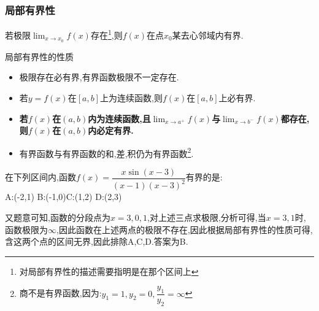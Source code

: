 \documentclass[10pt, a4paper, oneside, UTF8]{ctexbook}
\begin{document}
\begin{sloppypar}
    \subsubsection{局部有界性}
    \begin{them}{}{}
        若极限$\lim_{x \to x_0}f(x)$存在\footnote{对局部有界性的描述需要指明是在那个区间上},则$f(x)$在点$x_0$某去心邻域内有界.
    \end{them}
    \begin{criterion}{局部有界性的性质}{}
        \begin{itemize}
            \item 极限存在必有界,有界函数极限不一定存在.
            \item 若$y=f(x)$在$[a,b]$上为连续函数,则$f(x)$在$[a,b]$上必有界.
            \item \textbf{若$f(x)$在$(a,b)$内为连续函数,且$\lim_{x \to a^+}f(x)$与$\lim_{x\to b^-}f(x)$都存在,则$f(x)$在$(a,b)$内必定有界.}
            \item 有界函数与有界函数的和,差,积仍为有界函数\footnote{商不是有界函数,因为:$y_1=1,y_2=0,\dfrac{y_1}{y_2}=\infty$}.
        \end{itemize}
    \end{criterion}
    \begin{problem}
    在下列区间内,函数$f(x)={\dfrac{x\sin(x-3)}{(x-1)(x-3)^{2}}}$有界的是:\\
    A:(-2,1) \qquad  B:(-1,0)\qquad C:(1,2) \qquad D:(2,3)
    \end{problem}
    \begin{solution}
        又题意可知,函数的分段点为$x=3,0,1$,对上述三点求极限,分析可得,当$x=3,1$时,函数极限为$\infty$,因此函数在上述两点的极限不存在,因此根据局部有界性的性质可得,含这两个点的区间无界,因此排除A,C,D.答案为B.
    \end{solution}

\end{sloppypar}
\end{document}

